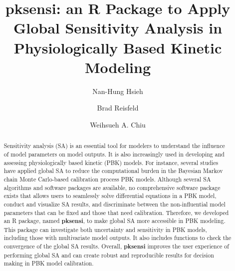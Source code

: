 \documentclass[preprint,12pt, a4paper]{elsarticle}
\begin{document}
\begin{frontmatter}



\title{pksensi: an R Package to Apply Global Sensitivity Analysis in
Physiologically Based Kinetic Modeling}


\author[1]{Nan-Hung Hsieh}
\author[2]{Brad Reisfeld}
\author[1]{Weihsueh A. Chiu}

\address[1]{
Veterinary Integrative Biosciences, College of Veterinary Medicine and
Biomedical Sciences, Texas A\&M University, College Station, TX, USA\\
}
\address[2]{
Chemical and Biological Engineering and School of Biomedical
Engineering, Colorado State University, Fort Collins, CO, USA\\
}


\begin{abstract}
Sensitivity analysis (SA) is an essential tool for modelers to understand the influence of model parameters on model outputs. It is also increasingly used in developing and assessing physiologically based kinetic (PBK) models. For instance, several studies have applied global SA to reduce the computational burden in the Bayesian Markov chain Monte Carlo-based calibration process PBK models. Although several SA algorithms and software packages are available, no comprehensive software package exists that allows users to seamlessly solve differential equations in a PBK model, conduct and visualize SA results, and discriminate between the non-influential model parameters that can be fixed and those that need calibration.  Therefore, we developed an R package, named \textbf{pksensi}, to make global SA more accessible in PBK modeling. This package can investigate both uncertainty and sensitivity in PBK models, including those with multivariate model outputs. It also includes functions to check the convergence of the global SA results. Overall, \textbf{pksensi} improves the user experience of performing global SA and can create robust and reproducible results for decision making in PBK model calibration.


\end{abstract}
\end{frontmatter}
\end{document}
